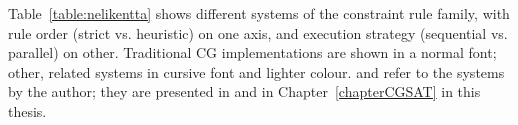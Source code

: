 Table~\ref{table:nelikentta} shows different systems of the constraint rule family, 
with rule order (strict vs. heuristic) on one axis, 
and execution strategy (sequential vs. parallel) on other. 
Traditional CG implementations are shown in a normal font; other, related systems in cursive font and lighter colour.
\satcgMax and \satcgOrd refer to the systems by the author; they are presented in \cite{listenmaa_claessen2015} and in Chapter~\ref{chapterCGSAT} in this thesis.






% 
% 
% 
% 
% 

  
